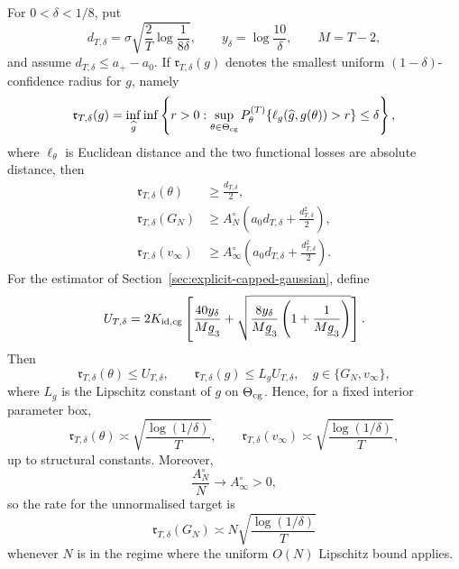 \begin{corollary}
\label{cor:lb-confidence}
For \(0<\delta<1/8\), put
\[
 d_{T,\delta}
 =\sigma\sqrt{\frac{2}{T}\log\frac{1}{8\delta}},
 \qquad
 y_\delta=\log\frac{10}{\delta},
 \qquad M=T-2,
\]
and assume \(d_{T,\delta}\leq a_+-a_0\).  If
\(\mathfrak r_{T,\delta}(g)\) denotes the smallest uniform
\((1-\delta)\)-confidence radius for \(g\), namely
\[
 \mathfrak r_{T,\delta}(g)
 =
 \inf_{\widehat g}\inf\left\{r>0:
 \sup_{\theta\in\Theta_{\rm cg}}
 P_\theta^{(T)}
 \{\ell_g(\widehat g,g(\theta))>r\}\leq\delta\right\},
\]
where \(\ell_\theta\) is Euclidean distance and the two functional losses
are absolute distance, then
\begin{align}
 \mathfrak r_{T,\delta}(\theta)
 &\geq\frac{d_{T,\delta}}2,
 \label{eq:lb-radius-theta}\\
 \mathfrak r_{T,\delta}(G_N)
 &\geq A_N^\circ
 \left(a_0d_{T,\delta}+\frac{d_{T,\delta}^2}{2}\right),
 \label{eq:lb-radius-GN}\\
 \mathfrak r_{T,\delta}(v_\infty)
 &\geq A_\infty^\circ
 \left(a_0d_{T,\delta}+\frac{d_{T,\delta}^2}{2}\right).
 \label{eq:lb-radius-vinfty}
\end{align}
For the estimator of Section~\ref{sec:explicit-capped-gaussian}, define
\[
 U_{T,\delta}
 =
 2K_{\rm id,cg}
 \left[
 \frac{40y_\delta}{M\underline g_3}
 +\sqrt{\frac{8y_\delta}{M\underline g_3}
 \left(1+\frac{1}{M\underline g_3}\right)}
 \right].
\]
Then
\begin{equation}
 \mathfrak r_{T,\delta}(\theta)\leq U_{T,\delta},
 \qquad
 \mathfrak r_{T,\delta}(g)\leq L_gU_{T,\delta},
 \quad g\in\{G_N,v_\infty\},
 \label{eq:lb-upper-radius}
\end{equation}
where \(L_g\) is the Lipschitz constant of \(g\) on
\(\Theta_{\rm cg}\).  Hence, for a fixed interior parameter box,
\[
 \mathfrak r_{T,\delta}(\theta)
 \asymp
 \sqrt{\frac{\log(1/\delta)}{T}},
 \qquad
 \mathfrak r_{T,\delta}(v_\infty)
 \asymp
 \sqrt{\frac{\log(1/\delta)}{T}},
\]
up to structural constants.  Moreover,
\begin{equation}
 \frac{A_N^\circ}{N}\longrightarrow A_\infty^\circ>0,
 \label{eq:lb-AN-limit}
\end{equation}
so the rate for the unnormalised target is
\[
 \mathfrak r_{T,\delta}(G_N)
 \asymp
 N\sqrt{\frac{\log(1/\delta)}{T}}
\]
whenever \(N\) is in the regime where the uniform \(O(N)\) Lipschitz
bound applies.
\end{corollary}

